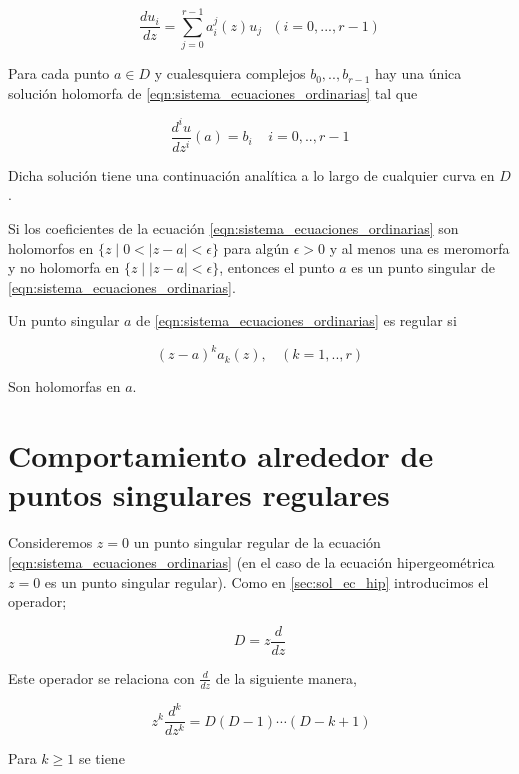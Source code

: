 \begin{equation}
\frac{du_{i}}{dz} = \sum_{j=0}^{r-1} a_{i}^{j}(z)u_{j} \ \ \ (i=0,...,r-1)
\end{equation}


\begin{thm}Para cada punto $a \in D$ y cualesquiera complejos $b_{0},..,b_{r-1}$ hay una \'unica soluci\'on holomorfa de \ref{eqn:sistema_ecuaciones_ordinarias} tal que

$$\frac{d^{i}u}{dz^{i}}(a) = b_{i} \ \ \ \ \ i=0,..,r-1$$

Dicha soluci\'on tiene una continuaci\'on anal\'itica a lo largo de cualquier curva en $D$.
\end{thm}

Si los coeficientes de la ecuaci\'on \ref{eqn:sistema_ecuaciones_ordinarias} son holomorfos en $\lbrace z \mid 0 < |z-a|< \epsilon  \rbrace $ para alg\'un $\epsilon > 0 $ y al menos una es meromorfa y no holomorfa en $\lbrace z \mid |z-a| < \epsilon \rbrace$, entonces el punto $a$ es un punto singular de \ref{eqn:sistema_ecuaciones_ordinarias}. \\

\begin{defn} Un punto singular $a$ de \ref{eqn:sistema_ecuaciones_ordinarias} es regular si

$$(z-a)^{k}a_{k}(z), \ \ \ \ (k=1,..,r)$$

Son holomorfas en $a$.
\end{defn}

\section{Comportamiento alrededor de puntos singulares regulares}

Consideremos $z=0$ un punto singular regular de la ecuaci\'on  \ref{eqn:sistema_ecuaciones_ordinarias} (en el caso de la ecuaci\'on hipergeom\'etrica $z=0$ es un punto singular regular). Como en \ref{sec:sol_ec_hip} introducimos el operador;

$$D= z\frac{d}{dz} $$

Este operador se relaciona con $\frac{d}{dz}$ de la siguiente manera,

\begin{equation}  \label{relacion-operadores-com-alr-pun-sing}  \ z^{k}\frac{d^{k}}{dz^{k}}= D(D-1) \cdots (D-k+1) \end{equation}

Para $k \geq 1 $ se tiene

